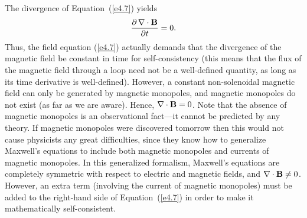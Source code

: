 The divergence of Equation~(\ref{e4.7}) yields
\begin{equation}
\frac{\partial\, \nabla\cdot{\bf B}}{\partial t} = 0.
\end{equation}
Thus, the field equation (\ref{e4.7}) actually demands that the divergence of the
magnetic field be constant in time for self-consistency (this means
that the flux of the magnetic field through a loop need  not be a well-defined
quantity, as long as 
its time derivative is well-defined). However, a constant
non-solenoidal magnetic field can only be generated by magnetic monopoles,
and magnetic monopoles do not exist (as far as we are aware). Hence,
$\nabla\cdot {\bf B} = 0$. Note that the absence of magnetic monopoles
is an observational fact---it cannot be predicted by any theory. If 
 magnetic monopoles were discovered  tomorrow then this would not cause physicists
any great difficulties, since they know how to generalize Maxwell's equations to include
both magnetic monopoles and currents of magnetic monopoles. In this generalized
formalism, Maxwell's equations are completely symmetric with respect to
electric and magnetic fields, and $\nabla\cdot{\bf B} \neq 0$. However,
an extra term (involving the current of magnetic monopoles) must be added to the
right-hand side of Equation~(\ref{e4.7}) in order to make it  mathematically self-consistent.

